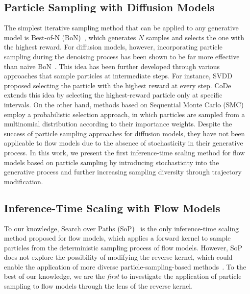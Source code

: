\subsection{Particle Sampling with Diffusion Models}
\vspace{-0.5\baselineskip}
\label{sec:inference_time_scaling}
The simplest iterative sampling method that can be applied to any generative model is Best-of-N (BoN)~\cite{Stiennon:2020BoN, Touvron:2023llama2, Tang:2024Realfill}, which generates $N$ samples and selects the one with the highest reward. For diffusion models, however, incorporating particle sampling during the denoising process has been shown to be far more effective than na\"ive BoN~\cite{Singh:2025CoDE, Li2024:SVDD}. This idea has been further developed through various approaches that sample particles at intermediate steps. For instance, SVDD~\cite{Li2024:SVDD} proposed selecting the particle with the highest reward at every step. 
CoDe~\cite{Singh:2025CoDE} extends this idea by selecting the highest-reward particle only at specific intervals. 
On the other hand, methods based on Sequential Monte Carlo (SMC)~\cite{Wu:2023TDS, Cardoso2024:MCGDiff, Kim:2025DAS, Dou2024:FPS} employ a probabilistic selection approach, in which particles are sampled from a multinomial distribution according to their importance weights. 
Despite the success of particle sampling approaches for diffusion models, they have not been applicable to flow models due to the absence of stochasticity in their generative process. In this work, we present the first inference-time scaling method for flow models based on particle sampling by introducing stochasticity into the generative process and further increasing sampling diversity through trajectory modification.

\vspace{-0.55\baselineskip}
\subsection{Inference-Time Scaling with Flow Models}
\vspace{-0.5\baselineskip}
To our knowledge, Search over Paths (SoP)~\cite{Ma2025:SoP} is the only inference-time scaling method proposed for flow models, which applies a forward kernel to sample particles from the deterministic sampling process of flow models. 
However, SoP does not explore the possibility of modifying the reverse kernel, which could enable the application of more diverse particle-sampling-based methods~\cite{Li2024:SVDD, Singh:2025CoDE, Kim:2025DAS}.
To the best of our knowledge, we are the \emph{first} to investigate the application of particle sampling to flow models through the lens of the reverse kernel.

